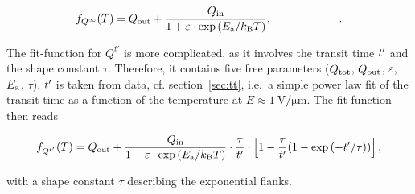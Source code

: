 \begin{equation}
 f_{Q^{\infty}}(T) = \Qo + \frac{\Qin}{1+\varepsilon\cdot\exppEa},\phantom{\frac{\tau}{\ttr}\exp{\left(-\ttr/\tau\right)}}.
 \label{eq:fitQinfty}
\end{equation}


The fit-function for $Q^{t'}$ is more complicated, as it involves the transit time $\mathnormal{t'}$ and the shape constant $\tau$. 
Therefore, it contains five free parameters ($Q_{\textrm{tot}}$, $Q_{\textrm{out}}$, $\varepsilon$, $E_{\textrm{a}}$, $\tau$). %
$\mathnormal{t'}$ is taken from data, cf. section~\ref{sec:tt},
 i.e.~a simple power law fit of the transit time as a function of the temperature at $E \approx \SI{1}{\volt/\micro\meter}$. 
The fit-function then reads

\begin{equation}
 f_{Q^{t'}}(T) = Q_{\textrm{out}} + \frac{Q_{\textrm{in}}}{1+\varepsilon\cdot\exp{\left( E_{\textrm{a}}/k_{\textrm{B}}T \right)}}\cdot \frac{\tau}{\mathnormal{t'}} \cdot \left[ 1 - \frac{\tau}{\mathnormal{t'}} (1 - \exp{\left(-\mathnormal{t'}/\tau\right)}  ) \right] ,
 \label{eq:fitQtprime}
\end{equation}

\noindent
with a shape constant $\tau$ describing the exponential flanks. 

